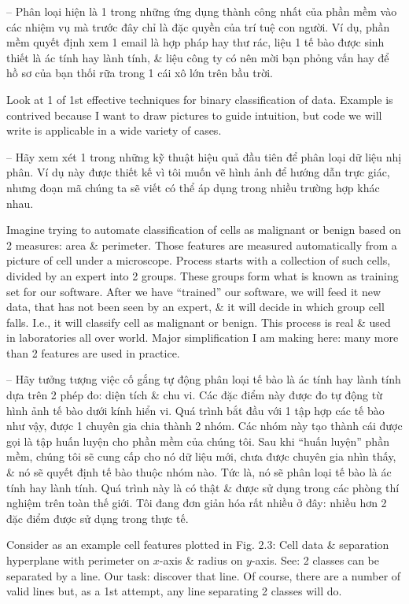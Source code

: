 \documentclass{article}
\begin{document}
\begin{itemize}
\begin{itemize}
        -- Phân loại hiện là 1 trong những ứng dụng thành công nhất của phần mềm vào các nhiệm vụ mà trước đây chỉ là đặc quyền của trí tuệ con người. Ví dụ, phần mềm quyết định xem 1 email là hợp pháp hay thư rác, liệu 1 tế bào được sinh thiết là ác tính hay lành tính, \& liệu công ty có nên mời bạn phỏng vấn hay để hồ sơ của bạn thối rữa trong 1 cái xô lớn trên bầu trời.

        Look at 1 of 1st effective techniques for binary classification of data. Example is contrived because I want to draw pictures to guide intuition, but code we will write is applicable in a wide variety of cases.

        -- Hãy xem xét 1 trong những kỹ thuật hiệu quả đầu tiên để phân loại dữ liệu nhị phân. Ví dụ này được thiết kế vì tôi muốn vẽ hình ảnh để hướng dẫn trực giác, nhưng đoạn mã chúng ta sẽ viết có thể áp dụng trong nhiều trường hợp khác nhau.

        Imagine trying to automate classification of cells as malignant or benign based on 2 measures: area \& perimeter. Those features are measured automatically from a picture of cell under a microscope. Process starts with a collection of such cells, divided by an expert into 2 groups. These groups form what is known as training set for our software. After we have ``trained'' our software, we will feed it new data, that has not been seen by an expert, \& it will decide in which group cell falls. I.e., it will classify cell as malignant or benign. This process is real \& used in laboratories all over world. Major simplification I am making here: many more than 2 features are used in practice.

        -- Hãy tưởng tượng việc cố gắng tự động phân loại tế bào là ác tính hay lành tính dựa trên 2 phép đo: diện tích \& chu vi. Các đặc điểm này được đo tự động từ hình ảnh tế bào dưới kính hiển vi. Quá trình bắt đầu với 1 tập hợp các tế bào như vậy, được 1 chuyên gia chia thành 2 nhóm. Các nhóm này tạo thành cái được gọi là tập huấn luyện cho phần mềm của chúng tôi. Sau khi ``huấn luyện'' phần mềm, chúng tôi sẽ cung cấp cho nó dữ liệu mới, chưa được chuyên gia nhìn thấy, \& nó sẽ quyết định tế bào thuộc nhóm nào. Tức là, nó sẽ phân loại tế bào là ác tính hay lành tính. Quá trình này là có thật \& được sử dụng trong các phòng thí nghiệm trên toàn thế giới. Tôi đang đơn giản hóa rất nhiều ở đây: nhiều hơn 2 đặc điểm được sử dụng trong thực tế.

        Consider as an example cell features plotted in {\sf Fig. 2.3: Cell data \& separation hyperplane} with perimeter on $x$-axis \& radius on $y$-axis. See: 2 classes can be separated by a line. Our task: discover that line. Of course, there are a number of valid lines but, as a 1st attempt, any line separating 2 classes will do.


\end{itemize}
\end{itemize}
\end{document}
